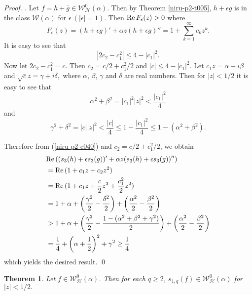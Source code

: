 \documentclass[a4paper,12pt]{amsart}
\theoremstyle{plain}
\newtheorem{thm}[equation]{Theorem}
\theoremstyle{definition}
\newenvironment{pf}[1][]{ \vskip 3mm
 \noindent
 \ifthenelse{\equal{#1}{}}  {{\slshape Proof. }}  {{\slshape #1.} } }{\qed\bigskip}
\begin{document}
\begin{pf} Let  $f = h + \overline{g}\in\mathcal{W}^0_{\mathcal{H}}(\alpha)$. Then by Theorem \ref{niru-p2-t005}, $h + \epsilon g$ is in the class $\mathcal{W}(\alpha)$ for  $\epsilon~ (|\epsilon | =1)$.
Then ${\rm Re\,}F_{\epsilon}(z) > 0$ where
$$
F_{\epsilon}(z) = (h + \epsilon g)' + \alpha z (h + \epsilon g)'' = 1 +\sum_{k =1}^{\infty}c_k z^k.
$$
It is easy to see that
$$
|2c_2 - c_1^2|\leq 4 - |c_1|^2.
$$
Now let  $2 c_2 - c_1^2 = c$. Then $c_2 = {c}/{2} + {c_1^2}/{2}$ and $|c|\leq 4 - |c_1|^2.$
Let $c_1 z = \alpha + i \beta$ and $\surd{c} z = \gamma + i \delta,$ where $\alpha$, $\beta$, $\gamma$ and $\delta$ are real numbers. Then for $|z|< 1/2$ it is easy to see that
$$
\alpha^2 + \beta ^2 = |c_1|^2|z|^2 < \frac{|c_1|^2}{4}
$$
and
\begin{equation}\label{niru-p2-e040}
\gamma ^2 + \delta ^2 = |c||z|^2 < \frac{|c|}{4} \leq 1 - \frac{|c_1|^2}{4} \leq 1 - (\alpha^2 + \beta ^2).
\end{equation}

Therefore from (\ref{niru-p2-e040}) and $c_2 = {c}/{2} + {c_1^2}/{2}$, we obtain
\begin{align*}
&{\rm Re\,}((s_3(h) + \epsilon s_3(g))' + \alpha z(s_3(h) + \epsilon s_3(g))'')\\
& = {\rm Re\,} (1 + c_1 z + c_2 z^2)\\
& =  {\rm Re\,} (1 + c_1 z + \frac{c}{2} z^2 + \frac{c_1^2}{2} z^2)\\
& = 1 + \alpha + \left(\frac{\gamma^2}{2} - \frac{\delta ^2}{2}\right) + \left(\frac{\alpha^2}{2}- \frac{\beta^2}{2}\right)\\
& > 1 + \alpha + \left(\frac{\gamma^2}{2} - \frac{1 - (\alpha^2 + \beta^2 + \gamma^2)}{2}\right) +  \left(\frac{\alpha^2}{2}- \frac{\beta^2}{2}\right)\\
& = \frac{1}{4} + \left( \alpha + \frac{1}{2}\right)^2 + \gamma^2 \geq \frac{1}{4}
\end{align*}
which yields the desired result.
\end{pf}

\begin{thm}

Let $f\in \mathcal{W}^0_{\mathcal{H}}(\alpha)$. Then for each $q\geq 2$, $s_{1,q}(f)\in\mathcal{W}^0_{\mathcal{H}}(\alpha)$ for $|z|< 1/2.$

\end{thm}
\end{document}
